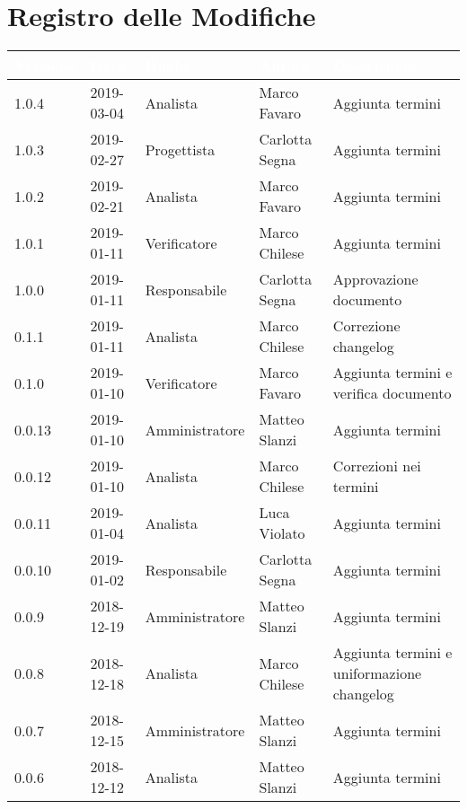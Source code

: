 \section*{Registro delle Modifiche}

\begin{center}
\begin{longtable}[c]{|m{}|m{}|m{}|m{}|p{}|}
\hline
\rowcolor{bluelogo}\textbf{\textcolor{white}{Versione}} & \textbf{\textcolor{white}{Data}} & \textbf{\textcolor{white}{Ruolo}} & \textbf{\textcolor{white}{Autore}} & \textbf{\textcolor{white}{Descrizione}} \\
\hline \hline
\endhead
\rowcolor{grigio}1.0.4 & 2019-03-04 & Analista & Marco Favaro & Aggiunta termini \\
\hline
1.0.3 & 2019-02-27 & Progettista & Carlotta Segna & Aggiunta termini \\
\hline
\rowcolor{grigio}1.0.2 & 2019-02-21 & Analista & Marco Favaro & Aggiunta termini\\
\hline
1.0.1 & 2019-01-11 & Verificatore & Marco Chilese & Aggiunta termini\\
\hline
\rowcolor{grigio}1.0.0 & 2019-01-11 & Responsabile & Carlotta Segna & Approvazione documento \\
\hline
0.1.1 & 2019-01-11 & Analista & Marco Chilese & Correzione changelog\\
\hline
\rowcolor{grigio}0.1.0 & 2019-01-10 & Verificatore & Marco Favaro & Aggiunta termini e verifica documento\\
\hline
0.0.13 & 2019-01-10 & Amministratore & Matteo Slanzi & Aggiunta termini\\
\hline
\rowcolor{grigio}0.0.12 & 2019-01-10 & Analista & Marco Chilese & Correzioni nei termini\\
\hline
0.0.11 & 2019-01-04 & Analista & Luca Violato & Aggiunta termini\\
\hline
\rowcolor{grigio} 0.0.10 & 2019-01-02 & Responsabile & Carlotta Segna & Aggiunta termini\\
\hline
0.0.9 & 2018-12-19 & Amministratore & Matteo Slanzi & Aggiunta termini\\
\hline
\rowcolor{grigio}0.0.8 & 2018-12-18 & Analista & Marco Chilese & Aggiunta termini e uniformazione changelog\\
\hline
0.0.7 & 2018-12-15 & Amministratore & Matteo Slanzi & Aggiunta termini\\
\hline
\rowcolor{grigio}0.0.6 & 2018-12-12 & Analista & Matteo Slanzi & Aggiunta termini\\

\end{longtable}
\end{center}
